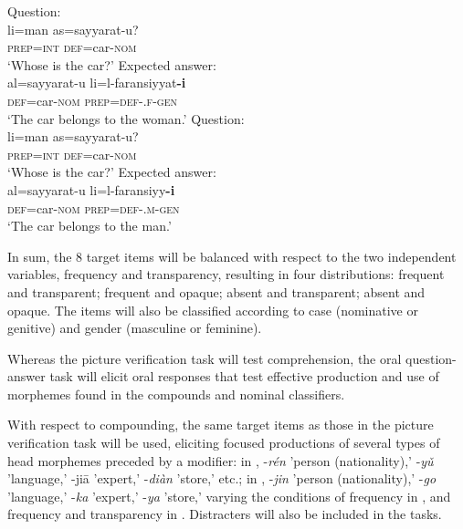 \documentclass[output=paper,colorlinks,citecolor=brown,modfonts,nonflat]{../langscibook}
\begin{document}
\ea%
    \label{ex:watorek:19}
    \ea%
    \label{ex:watorek:19a}
        \ea
            Question: \\
            \gll    li=man as=sayyarat-u?\\
                    \textsc{prep=int} \textsc{def=}car\textsc{-nom}\\
            \glt    ‘Whose is the car?’
        \ex%
        \label{ex:watorek:19b}
            Expected answer:\\
            \gll        al=sayyarat-u li=l-faransiyyat\textbf{{-i}}\\
                    \textsc{def=}car\textsc{-nom} \textsc{prep=def-}\textsc{.f{-gen}}\\
            \glt    ‘The car belongs to the  woman.’
        \z
    \ex%
        \ea
        \label{ex:watorek:19c}
            Question:\\
            \gll    li=man as=sayyarat-u?\\
                    \textsc{prep=int} \textsc{def=}car\textsc{-nom}\\
            \glt    ‘Whose is the car?’
        \ex%
        \label{ex:watorek:19d}
            Expected answer:\\
            \gll    al=sayyarat-u li=l-faransiyy\textbf{{-i}}\\
                    \textsc{def=}car\textsc{-nom} \textsc{prep=def-}\textsc{.m{-gen}}\\
            \glt    ‘The car belongs to the  man.’
        \z
    \z
\z

In sum, the 8 target items will be balanced with respect to the two independent variables, frequency and transparency, resulting in four distributions: frequent and transparent; frequent and opaque; absent and transparent; absent and opaque. The items will also be classified according to case (nominative or genitive) and gender (masculine or feminine). 

\label{sec:watorek:4.2.3.2}

Whereas the picture verification task will test comprehension, the oral question-answer task will elicit oral responses that test effective production and use of morphemes found in the compounds and nominal classifiers. 

With respect to compounding, the same target items as those in the picture verification task will be used, eliciting focused productions of several types of head morphemes preceded by a modifier: in , -\textit{rén} 'person (nationality),' -\textit{yǔ} 'language,' -jiā 'expert,' -\textit{diàn} 'store,' etc.; in , -\textit{jin} 'person (nationality),' -\textit{go} 'language,' -\textit{ka} 'expert,' -\textit{ya} 'store,' varying the conditions of frequency in , and frequency and transparency in . Distracters will also be included in the tasks.
\end{document}
